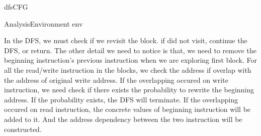 \documentclass{article}
\begin{document}
\begin{vAlgorithm}[]{0.5\textwidth}{1em}
  \SetNoFillComment
  \caption{dfsCFG}

  \Import AnalysisEnvironment \As env


\end{vAlgorithm}


In the DFS, we must check if we revisit the block. if did not visit, continue the DFS, or return. The other detail we need to notice is that, we need to remove the beginning instruction's previous instruction when we are exploring first block. For all the read/write instruction in the blocks, we check the address if overlap with the address of original write address. If the overlapping occured on write instruction, we need check if there exists the probability to rewrite the beginning address. If the probability exists, the DFS will terminate. If the overlapping occured on read instruction, the concrete values of beginning instruction will be added to it. And the address dependency between the two instruction will be constructed.
\end{document}

